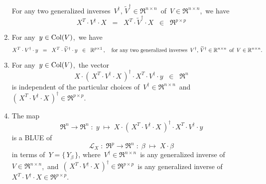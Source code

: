 \begin{theorem}
\begin{enumerate}
	For any two generalized inverses
	\,$V^{\dagger},\, \widetilde{V}^{\dagger} \in \Re^{n \times n}$\,
	of \,$V \in \Re^{n \times n}$,\, we have
	\begin{equation*}
	X^{T} \cdot V^{\dagger} \cdot X
	\;\; = \;\;
	X^{T} \cdot \widetilde{V}^{\dagger} \cdot X
	\;\; \in \;\; \Re^{p \times p}
	\end{equation*}
\item\label{XtVdaggerY}
	For any \,$y \in \Col(V)$,\, we have
	\begin{equation*}
	X^{T} \cdot V^{\dagger} \cdot y
	\;\; = \;\;
	X^{T} \cdot \widetilde{V}^{\dagger} \cdot y
	\;\; \in \;\; \Re^{p \times 1}\,,
	\quad
	\textnormal{for any two generalized inverses
	\,$V^{\dagger},\, \widetilde{V}^{\dagger} \in \Re^{n \times n}$\,
	of \,$V \in \Re^{n \times n}$}.
	\end{equation*}	
\item\label{XXtVdaggerXXtVdaggerY}
	For any \,$y \in \Col(V)$,\, the vector
	\begin{equation*}
	X \cdot \left(\,X^{T} \cdot V^{\dagger} \cdot X\,\right)^{\dagger} \cdot X^{T} \cdot V^{\dagger} \cdot y \;\; \in \;\; \Re^{n}
	\end{equation*}
	is independent of the particular choices of
	\,$V^{\dagger} \in \Re^{n \times n}$\,
	and
	\,$\left(\,X^{T} \cdot V^{\dagger} \cdot X\,\right)^{\dagger} \in \Re^{p \times p}$.
\item\label{formulaColXsubsetColV}
	{\color{red}The map
	\begin{equation*}
	\Re^{n} \longrightarrow \Re^{n}
	\; : \; y \; \longmapsto \;
	X \cdot \left(\,X^{T} \cdot V^{\dagger} \cdot X\,\right)^{\dagger} \cdot X^{T} \cdot V^{\dagger} \cdot y
	\end{equation*}
	is a BLUE of
	\begin{equation*}
	\mathcal{L}_{X} \; : \; \Re^{p} \longrightarrow \Re^{n} \; : \; \beta \; \longmapsto \; X \cdot \beta
	\end{equation*}
	in terms of
	\,$Y = \{\,Y_{\beta}\,\}$},
	where
	\,$V^{\dagger} \in \Re^{n \times n}$\, is any generalized inverse of \,$V \in \Re^{n \times n}$,\,
	and
	\,$\left(\,X^{T} \cdot V^{\dagger} \cdot X\,\right)^{\dagger} \in \Re^{p \times p}$\,
	is any generalized inverse of
	\,$X^{T} \cdot V^{\dagger} \cdot X \in \Re^{p \times p}$.

\end{enumerate}
\end{theorem}
